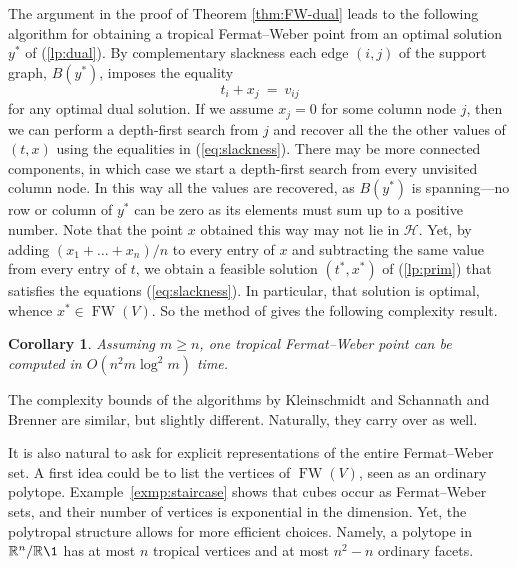 \documentclass[a4paper,12pt]{amsart}
\newcommand\RR{{\mathbb R}}
\newcommand\cH{{\mathcal H}}
\newcommand\torus[1]{\RR^{#1}/\RR\1} %
\DeclareMathOperator{\FW}{FW} %
\newtheorem{corollary}[theorem]{Corollary}
\theoremstyle{remark}
\begin{document}
The argument in the proof of Theorem \ref{thm:FW-dual} leads to the following algorithm for obtaining a tropical Fermat--Weber point from an optimal solution $y^*$ of  (\ref{lp:dual}).
By complementary slackness each edge $(i,j)$ of the support graph, $B(y^*)$, imposes the equality
\begin{equation} \label{eq:slackness}
t_i+x_j \ = \ v_{ij}
\end{equation}
for any optimal dual solution.
If we assume $x_j=0$ for some column node $j$, then we can perform a depth-first search from $j$ and recover all the the other values of $(t,x)$ using the equalities in (\ref{eq:slackness}).
There may be more connected components, in which case we start a depth-first search from every unvisited column node.
In this way all the values are recovered, as $B(y^*)$ is spanning---no row or column of $y^*$ can be zero as its elements must sum up to a positive number.
Note that the point $x$ obtained this way may not lie in $\cH$.
Yet, by adding $(x_1+\dots+x_n)/n$ to every entry of $x$ and subtracting the same value from every entry of $t$, we obtain a feasible solution $(t^*,x^*)$ of (\ref{lp:prim}) that satisfies the equations (\ref{eq:slackness}).
In particular, that solution is optimal, whence $x^*\in\FW(V)$.
So the method of \cite{Tokuyama+Nakano:1995} gives the following complexity result.
\begin{corollary} \label{cor:compFW}
  Assuming $m\geq n$, one tropical Fermat--Weber point can be computed in $O(n^2m\log^2 m)$ time.
\end{corollary}
The complexity bounds of the algorithms by Kleinschmidt and Schannath \cite{Kleinschmidt+Schannath:1995} and Brenner \cite{Brenner:2008} are similar, but slightly different.
Naturally, they carry over as well.

It is also natural to ask for explicit representations of the entire Fermat--Weber set.
A first idea could be to list the vertices of $\FW(V)$, seen as an ordinary polytope.
Example~\ref{exmp:staircase} shows that cubes occur as Fermat--Weber sets, and their number of vertices is exponential in the dimension.
Yet, the polytropal structure allows for more efficient choices.
Namely, a polytope in $\torus{n}$ has at most $n$ tropical vertices and at most $n^2-n$ ordinary facets.
\end{document}
